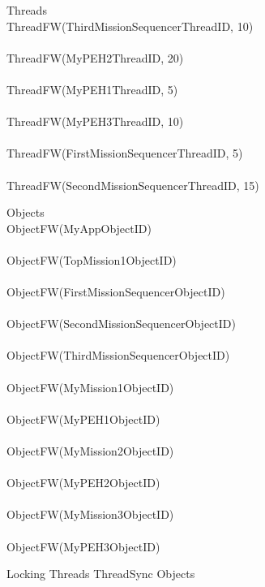 %
\begin{circus}
\circprocess Threads \circdef  \\
\circblockopen
ThreadFW(ThirdMissionSequencerThreadID, 10) \\
\interleave \\
ThreadFW(MyPEH2ThreadID, 20) \\
\interleave \\
ThreadFW(MyPEH1ThreadID, 5) \\
\interleave \\
ThreadFW(MyPEH3ThreadID, 10) \\
\interleave \\
ThreadFW(FirstMissionSequencerThreadID, 5) \\
\interleave \\
ThreadFW(SecondMissionSequencerThreadID, 15) \\

\circblockclose
\end{circus}
%
%
\begin{circus}
\circprocess Objects \circdef \\
\circblockopen
ObjectFW(MyAppObjectID) \\
\interleave \\
ObjectFW(TopMission1ObjectID) \\
\interleave \\
ObjectFW(FirstMissionSequencerObjectID) \\
\interleave \\
ObjectFW(SecondMissionSequencerObjectID) \\
\interleave \\
ObjectFW(ThirdMissionSequencerObjectID) \\
\interleave \\
ObjectFW(MyMission1ObjectID) \\
\interleave \\
ObjectFW(MyPEH1ObjectID) \\
\interleave \\
ObjectFW(MyMission2ObjectID) \\
\interleave \\
ObjectFW(MyPEH2ObjectID) \\
\interleave \\
ObjectFW(MyMission3ObjectID) \\
\interleave \\
ObjectFW(MyPEH3ObjectID) \\

\circblockclose
\end{circus}
%
%
\begin{circus}
\circprocess Locking \circdef Threads \lpar ThreadSync \rpar Objects
\end{circus}
